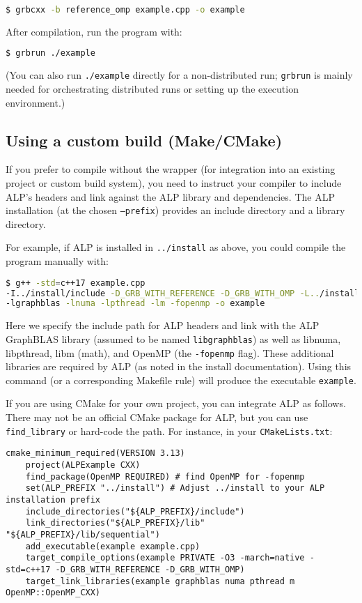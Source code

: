 \begin{lstlisting}[language=bash]
$ grbcxx -b reference_omp example.cpp -o example
\end{lstlisting}
After compilation, run the program with:
\begin{lstlisting}[language=bash]
$ grbrun ./example
\end{lstlisting}

(You can also run \texttt{./example} directly for a non-distributed run; \texttt{grbrun} is mainly needed for orchestrating distributed runs or setting up the execution environment.)

\subsection*{Using a custom build (Make/CMake)}

If you prefer to compile without the wrapper (for integration into an existing project or custom build system), you need to instruct your compiler to include ALP's headers and link against the ALP library and dependencies. The ALP installation (at the chosen \texttt{--prefix}) provides an include directory and a library directory.

For example, if ALP is installed in \texttt{../install} as above, you could compile the program manually with:
\begin{lstlisting}[language=bash]
$ g++ -std=c++17 example.cpp
-I../install/include -D_GRB_WITH_REFERENCE -D_GRB_WITH_OMP -L../install/lib/sequential
-lgraphblas -lnuma -lpthread -lm -fopenmp -o example
\end{lstlisting}
Here we specify the include path for ALP headers and link with the ALP GraphBLAS library (assumed to be named \texttt{libgraphblas}) as well as libnuma, libpthread, libm (math), and OpenMP (the \texttt{-fopenmp} flag). These additional libraries are required by ALP (as noted in the install documentation). Using this command (or a corresponding Makefile rule) will produce the executable \texttt{example}.

If you are using CMake for your own project, you can integrate ALP as follows. There may not be an official CMake package for ALP, but you can use \texttt{find\_library} or hard-code the path. For instance, in your \texttt{CMakeLists.txt}:

\begin{lstlisting}[caption={Example CMakeLists.txt for an ALP project}]
    cmake_minimum_required(VERSION 3.13)
    project(ALPExample CXX)
    find_package(OpenMP REQUIRED) # find OpenMP for -fopenmp
    set(ALP_PREFIX "../install") # Adjust ../install to your ALP installation prefix
    include_directories("${ALP_PREFIX}/include")
    link_directories("${ALP_PREFIX}/lib" "${ALP_PREFIX}/lib/sequential")
    add_executable(example example.cpp)
    target_compile_options(example PRIVATE -O3 -march=native -std=c++17 -D_GRB_WITH_REFERENCE -D_GRB_WITH_OMP)
    target_link_libraries(example graphblas numa pthread m OpenMP::OpenMP_CXX)
\end{lstlisting}

